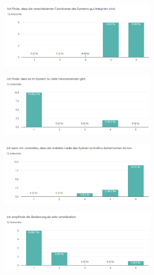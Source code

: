 \noChanges

\begin{figure}[H]
    \centering
    \includegraphics[width=0.7\textwidth]{media/survey/integrity.png}
\end{figure}

\noChanges

\begin{figure}[H]
    \centering
    \includegraphics[width=0.7\textwidth]{media/survey/inconsistent.png}
\end{figure}

\noChanges

\begin{figure}[H]
    \centering
    \includegraphics[width=0.7\textwidth]{media/survey/fastLearning.png}
\end{figure}

\noChanges
\begin{figure}[H]
    \centering
    \includegraphics[width=0.7\textwidth]{media/survey/overelaboratedInterface.png}
\end{figure}

